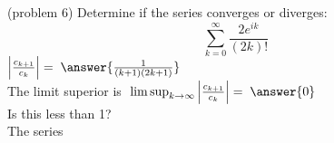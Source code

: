 \documentclass[handout]{ximera}
\begin{document}
\begin{problem}(problem 6)
Determine if the series converges or diverges: 
\[
\sum_{k=0}^\infty \frac{2e^{ik}}{(2k)!}
\]
$\left|\frac{c_{k+1}}{c_k}\right| = \; \answer{\frac{1}{(k+1)(2k+1)}}$\\
The limit superior is $\; \limsup_{k\to\infty}\left|\frac{c_{k+1}}{c_k}\right|= \; \answer{0}$\\
Is this less than 1? \\
The series  
\end{problem}
\end{document}

